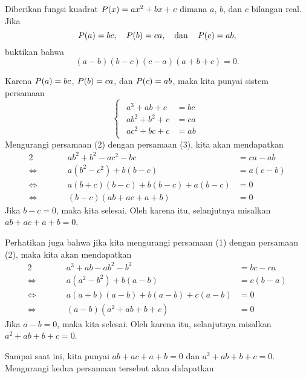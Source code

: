	\begin{contoh}[OSN 2020 P2]
		Diberikan fungsi kuadrat $ \mathop{}\!{P}{\left({x}\right)} = ax^{2} + bx + c $ dimana $ a $, $ b $, dan $ c $ bilangan real. Jika
		\[ \mathop{}\!{P}{\left({a}\right)} = bc, \quad \mathop{}\!{P}{\left({b}\right)} = ca, \quad \mbox{dan} \quad \mathop{}\!{P}{\left({c}\right)} = ab, \]
		buktikan bahwa
		\[ \left(a - b\right)\left(b - c\right)\left(c - a\right)\left(a + b + c\right) = 0. \]
	\end{contoh}
	\begin{jawab}
		Karena $ \mathop{}\!{P}{\left({a}\right)} = bc $, $ \mathop{}\!{P}{\left({b}\right)} = ca $, dan $ \mathop{}\!{P}{\left({c}\right)} = ab $, maka kita punyai sistem persamaan
		\[
			\begin{cases}
				\begin{aligned}
					a^{3} + ab + c &= bc \\
					ab^{2} + b^{2} + c &= ca \\
					ac^{2} + bc + c &= ab
				\end{aligned}
			\end{cases}
		\]
		Mengurangi persamaan (2) dengan persamaan (3), kita akan mendapatkan
		\begin{alignat*}{2}
			&\qquad& ab^{2} + b^{2} - ac^{2} - bc &= ca - ab \\
			\iff&& a\left(b^{2} - c^{2}\right) + b\left(b - c\right) &= a\left(c - b\right) \\
			\iff&& a\left(b + c\right)\left(b - c\right) + b\left(b - c\right) + a\left(b - c\right) &= 0 \\
			\iff&& \left(b - c\right)\left(ab + ac + a + b\right) &= 0
		\end{alignat*}
		Jika $ b - c = 0 $, maka kita selesai. Oleh karena itu, selanjutnya misalkan $ ab + ac + a + b = 0 $.
		\par Perhatikan juga bahwa jika kita mengurangi persamaan (1) dengan persamaan (2), maka kita akan mendapatkan
		\begin{alignat*}{2}
			&\qquad& a^{3} + ab - ab^{2} - b^{2} &= bc - ca \\
			\iff&& a\left(a^{2} - b^{2}\right) + b\left(a - b\right) &= c\left(b - a\right) \\
			\iff&& a\left(a + b\right)\left(a - b\right) + b\left(a - b\right) + c\left(a - b\right) &= 0 \\
			\iff&& \left(a - b\right)\left(a^{2} + ab + b + c\right) &= 0
		\end{alignat*}
		Jika $ a - b = 0 $, maka kita selesai. Oleh karena itu, selanjutnya misalkan $ a^{2} + ab + b + c = 0 $.
		\par Sampai saat ini, kita punyai $ ab + ac + a + b = 0 $ dan $ a^{2} + ab + b + c = 0 $. Mengurangi kedua persamaan tersebut akan didapatkan

\end{jawab}

